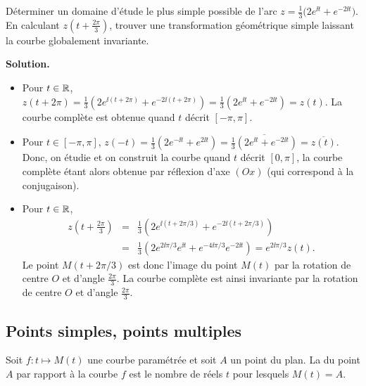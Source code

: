 \documentclass[class=report,crop=false]{standalone}
\begin{document}
\begin{exemple}
Déterminer un domaine d'étude le plus simple possible
de l'arc $z=\frac{1}{3}\big(2e^{\ii t}+e^{-2\ii t}\big)$. En calculant $z(t+\frac{2\pi}{3})$,
trouver une transformation géométrique
simple laissant la courbe globalement invariante.

\medskip
\textbf{Solution.}

\begin{itemize}
  \item Pour $t\in\mathbb{R}$,
$z(t+2\pi)=\frac{1}{3}\left(2e^{\ii(t+2\pi)}+e^{-2\ii(t+2\pi)}\right)
=\frac{1}{3}\left(2e^{\ii t}+e^{-2\ii t}\right)=z(t)$.
La courbe complète est obtenue quand $t$ décrit $[-\pi,\pi]$.

  \item Pour $t\in[-\pi,\pi]$,
$z(-t)=\frac{1}{3}\left(2e^{-\ii t}+e^{2\ii t}\right)
=\overline{\frac{1}{3}\left(2e^{\ii t}+e^{-2\ii t}\right)}=\overline{z(t)}$.
Donc, on étudie et on construit la courbe
quand $t$ décrit $[0,\pi]$, la courbe complète étant alors
obtenue par réflexion d'axe $(Ox)$ (qui correspond à la conjugaison).

  \item Pour $t\in\mathbb{R}$,
\begin{eqnarray*}
z(t+\frac{2\pi}{3})
&=&\frac{1}{3}\left(2e^{\ii(t+2\pi/3)}+e^{-2\ii(t+2\pi/3)}\right) \\
&=&\frac{1}{3}\left(2e^{2\ii \pi/3}e^{\ii t}+e^{-4\ii \pi/3}e^{-2\ii t}\right)=e^{2\ii \pi/3}z(t).
\end{eqnarray*}
Le point
$M(t+2\pi/3)$ est donc l'image du point $M(t)$ par la rotation
de centre $O$ et d'angle $\frac{2\pi}{3}$. La courbe complète est
ainsi invariante par la rotation de centre $O$
et d'angle $\frac{2\pi}{3}$.
\end{itemize}



\end{exemple}


\subsection{Points simples, points multiples}


\begin{definition}
Soit $f : t\mapsto M(t)$ une courbe paramétrée et soit $A$ un point du plan.
La  du point $A$ par rapport à la courbe $f$ est le nombre
de réels $t$ pour lesquels $M(t)=A$.
\end{definition}
\end{document}
